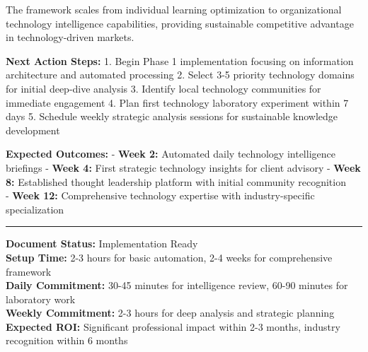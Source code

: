 \documentclass[
  letterpaper,
  DIV=11,
  numbers=noendperiod]{scrartcl}
\begin{document}
The framework scales from individual learning optimization to
organizational technology intelligence capabilities, providing
sustainable competitive advantage in technology-driven markets.

\textbf{Next Action Steps:} 1. Begin Phase 1 implementation focusing on
information architecture and automated processing 2. Select 3-5 priority
technology domains for initial deep-dive analysis 3. Identify local
technology communities for immediate engagement 4. Plan first technology
laboratory experiment within 7 days 5. Schedule weekly strategic
analysis sessions for sustainable knowledge development

\textbf{Expected Outcomes:} - \textbf{Week 2:} Automated daily
technology intelligence briefings - \textbf{Week 4:} First strategic
technology insights for client advisory - \textbf{Week 8:} Established
thought leadership platform with initial community recognition\\
- \textbf{Week 12:} Comprehensive technology expertise with
industry-specific specialization

\begin{center}\rule{0.5\linewidth}{0.5pt}\end{center}

\textbf{Document Status:} Implementation Ready\\
\textbf{Setup Time:} 2-3 hours for basic automation, 2-4 weeks for
comprehensive framework\\
\textbf{Daily Commitment:} 30-45 minutes for intelligence review, 60-90
minutes for laboratory work\\
\textbf{Weekly Commitment:} 2-3 hours for deep analysis and strategic
planning\\
\textbf{Expected ROI:} Significant professional impact within 2-3
months, industry recognition within 6 months
\end{document}
